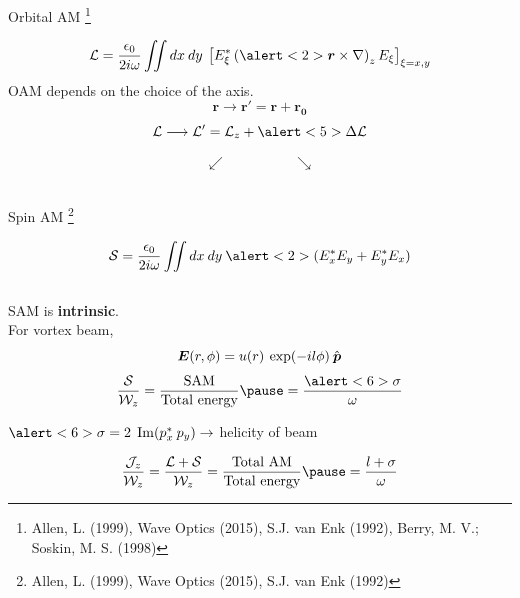 \documentclass[12pt, dvipsnames]{beamer}
\numberwithin{equation}{section}
\newcommand\blfootnote[1]{%
	\begingroup
	\renewcommand\thefootnote{}\footnote{#1}%
	\addtocounter{footnote}{-1}%
	\endgroup
}
\begin{document}
\begin{frame}[t]{Orbital AM}\blfootnote{Allen, L. (1999), Wave Optics (2015), S.J. van Enk (1992), Berry, M. V.; Soskin, M. S. (1998)}%
	\vspace{-9pt}
	$$\mathcal{L}
	= \frac{\epsilon_0}{2i\omega} \iint dx\:dy\:\left[E_\xi^\ast\left(\alert<2>{\boldsymbol{r}}\times\nabla\right)_zE_\xi\right]_{\xi=x,y}$$\pause
	\alert<2>{OAM depends on the choice of the axis.}\pause
	$$\boldsymbol{r}\longrightarrow\boldsymbol{r'}=\boldsymbol{r}+\boldsymbol{r_0}$$\pause\vspace{-8mm}
	$$\mathcal{L}\longrightarrow\mathcal{L'}= \mathcal{L}_z + \alert<5>{\Delta\mathcal{L}}$$\pause\vspace{-8mm}
	
	\begin{center}
		\vspace{-4mm}\pause
		$$\swarrow\hspace{2cm}\searrow$$\\\vspace{-2mm}\pause
		\hspace{1cm}
	\end{center}\pause

\end{frame}

\begin{frame}[t]{Spin AM}\blfootnote{Allen, L. (1999), Wave Optics (2015), S.J. van Enk (1992)}
	$$\mathcal{S}=\frac{\epsilon_0}{2i\omega}\iint dx\:dy\: \alert<2>{(E_x^\ast E_y + E_y^\ast E_x)}$$\\\pause
	\alert<2>{SAM is \textbf{intrinsic}}.\\\pause
	For vortex beam,
	$$\boldsymbol{E}(r,\phi)= u(r)\:\exp(-il\phi)\:\Hat{\boldsymbol{p}}$$\pause\vspace{-3mm}
	$$\frac{\mathcal{S}}{\mathcal{W}_z} =\frac{\text{SAM}}{\text{Total energy}} \pause = \frac{\alert<6>{\sigma}}{\omega} $$\pause
	
	$\alert<6>{\sigma=2\;\Im(p_x^\ast\: p_y)}\rightarrow$ helicity of beam\pause
	
	$$\frac{\mathcal{J}_z}{\mathcal{W}_z} = \frac{\mathcal{L}+\mathcal{S}}{\mathcal{W}_z} =\frac{\text{Total AM}}{\text{Total energy}} \pause=\frac{l+\sigma}{\omega}$$
\end{frame}
\end{document}
